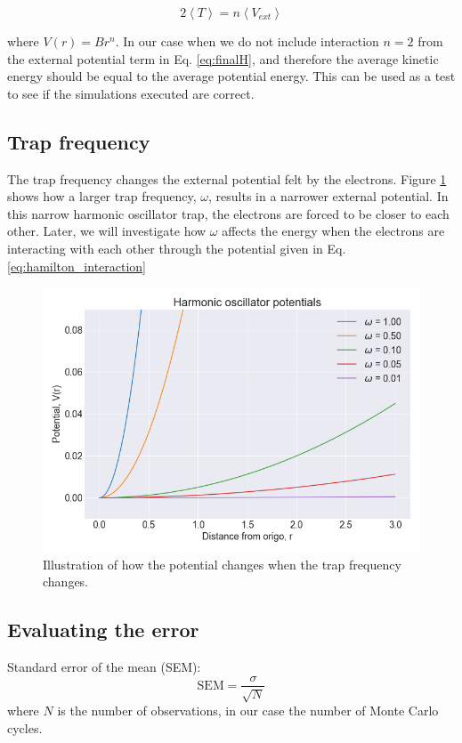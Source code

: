 \begin{equation}\label{eq:virial_theorem}
2\left< T\right> = n\left< V_{ext}\right>
\end{equation}

where $V(r) = Br^n$. In our case when we do not include interaction $n = 2$ from the external potential term in Eq. \ref{eq:finalH}, and therefore the average kinetic energy should be equal to the average potential energy. This can be used as a test to see if the simulations executed are correct. 

\subsection{Trap frequency}

The trap frequency changes the external potential felt by the electrons. Figure \ref{fig:harmonic_oscillator_potential} shows how a larger trap frequency, $\omega$, results in a narrower external potential. In this narrow harmonic oscillator trap, the electrons are forced to be closer to each other. Later, we will investigate how $\omega$ affects the energy when the electrons are interacting with each other through the potential given in Eq. \ref{eq:hamilton_interaction}

\begin{figure}[H]
\center
\includegraphics[width=0.7\linewidth]{../Results/harmonic_oscialltor_potentials}\caption{Illustration of how the potential changes when the trap frequency changes. }\label{fig:harmonic_oscillator_potential}
\end{figure}

\subsection{Evaluating the error}

Standard error of the mean (SEM):
\begin{equation}
\text{SEM} = \frac{\sigma}{\sqrt{N}}
\end{equation}
where $N$ is the number of observations, in our case the number of Monte Carlo cycles.

